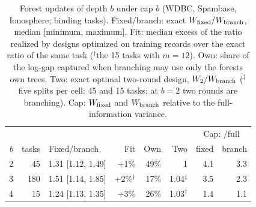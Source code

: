 \begin{table}[t]
\centering
\caption{Forest updates of depth $b$ under cap $b$ (WDBC, Spambase, Ionosphere; binding tasks). Fixed/branch: exact $W_{\rm fixed}/W_{\rm branch}$, median [minimum, maximum]. Fit: median excess of the ratio realized by designs optimized on training records over the exact ratio of the same task ($^\dagger$the 15 tasks with $m=12$). Own: share of the log-gap captured when branching may use only the forests\textquotesingle{} own trees. Two: exact optimal two-round design, $W_2/W_{\rm branch}$ ($^\ddagger$five splits per cell: 45 and 15 tasks; at $b=2$ two rounds are branching). Cap: $W_{\rm fixed}$ and $W_{\rm branch}$ relative to the full-information variance.}
\label{tab:capgrid}
\footnotesize
\setlength{\tabcolsep}{2.6pt}
\begin{tabular}{rrlrrrrr}
\toprule
 & & & & & & \multicolumn{2}{c}{Cap: /full} \\
$b$ & tasks & Fixed/branch & Fit & Own & Two & fixed & branch \\
\midrule
2 & 45 & 1.31 [1.12, 1.49] & +1\% & 49\% & 1 & 4.1 & 3.3 \\
3 & 180 & 1.51 [1.14, 1.85] & +2\%$^\dagger$ & 17\% & 1.04$^\ddagger$ & 3.5 & 2.3 \\
4 & 15 & 1.24 [1.13, 1.35] & +3\% & 26\% & 1.03$^\ddagger$ & 1.4 & 1.1 \\
\bottomrule
\end{tabular}
\end{table}
